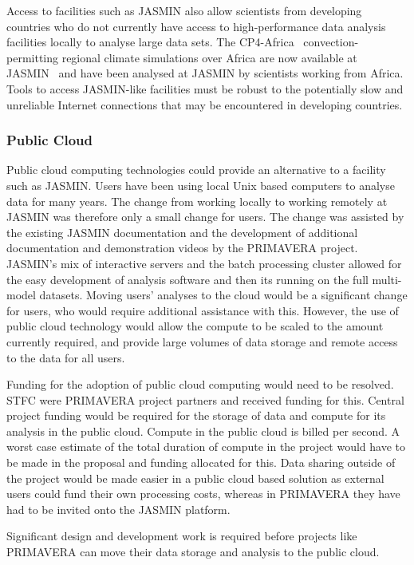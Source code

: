 \documentclass[gmd, manuscript]{copernicus}
\begin{document}
Access to facilities such as JASMIN also allow scientists from developing countries who do not currently have access to high-performance data analysis facilities locally to analyse large data sets. The CP4-Africa~\citep{Stratton2018} convection-permitting regional climate simulations over Africa are now available at JASMIN~\citep{Senior2019} and have been analysed at JASMIN by scientists working from Africa. Tools to access JASMIN-like facilities must be robust to the potentially slow and unreliable Internet connections that may be encountered in developing countries.


\subsubsection{Public Cloud}
Public cloud computing technologies could provide an alternative to a facility such as JASMIN. Users have been using local Unix based computers to analyse data for many years. The change from working locally to working remotely at JASMIN was therefore only a small change for users. The change was assisted by the existing JASMIN documentation and the development of additional documentation and demonstration videos by the PRIMAVERA project. JASMIN's mix of interactive servers and the batch processing cluster allowed for the easy development of analysis software and then its running on the full multi-model datasets. Moving users' analyses to the cloud would be a significant change for users, who would require additional assistance with this. However, the use of public cloud technology would allow the compute to be scaled to the amount currently required, and provide large volumes of data storage and remote access to the data for all users.

Funding for the adoption of public cloud computing would need to be resolved. STFC were PRIMAVERA project partners and received funding for this. Central project funding would be required for the storage of data and compute for its analysis in the public cloud. Compute in the public cloud is billed per second. A worst case estimate of the total duration of compute in the project would have to be made in the proposal and funding allocated for this. Data sharing outside of the project would be made easier in a public cloud based solution as external users could fund their own processing costs, whereas in PRIMAVERA they have had to be invited onto the JASMIN platform.

Significant design and development work is required before projects like PRIMAVERA can move their data storage and analysis to the public cloud.
\end{document}
